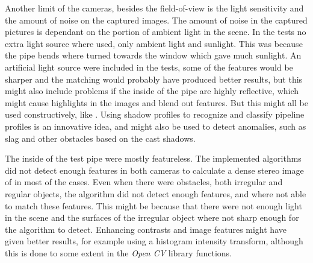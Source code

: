 Another limit of the cameras, besides the field-of-view is the light sensitivity and
the amount of noise on the captured images. The amount of noise in the captured pictures
is dependant on the portion of ambient light in the scene. In the tests no extra
light source where used, only ambient light and sunlight. This was because
the pipe bends where turned towards the window which gave much sunlight. An artificial
light source were included in the tests, some of the features would be sharper and the
matching would probably have produced better results, but this might also include problems if the
inside of the pipe are highly reflective, which might cause highlights in the images and 
blend out features. But this might all be used constructively, like \cite{MRINSPECT-V}.
Using shadow profiles to recognize and classify pipeline profiles is an innovative idea,
and might also be used to detect anomalies, such as slag and other obstacles based on the
cast shadows.

The inside of the test pipe were mostly featureless. The implemented algorithms did not
detect enough features in both cameras to calculate a dense stereo image of in most of the
cases. Even when there were obstacles, both irregular and regular objects, the algorithm did not
detect enough features, and where not able to match these features. This might be because
that there were not enough light in the scene and the surfaces of the irregular object
where not sharp enough for the algorithm to detect. Enhancing contrasts and image features
might have given better results, for example using a histogram intensity transform,
although this is done to some extent in the \emph{Open CV} library functions. \cite{gonzalez} 


